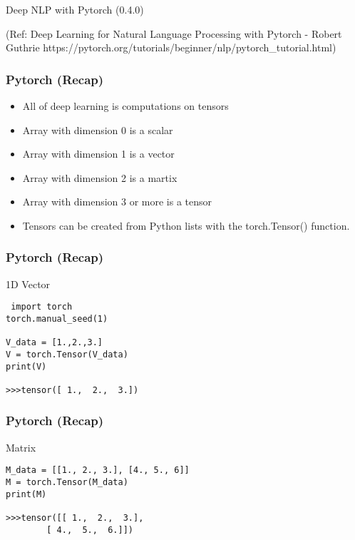 \begin{frame}[fragile]\frametitle{}

\begin{center}
{\Large Deep NLP with Pytorch (0.4.0)}

(Ref: Deep Learning for Natural Language Processing with Pytorch - Robert Guthrie  https://pytorch.org/tutorials/beginner/nlp/pytorch\_tutorial.html)
\end{center}
\end{frame}

\begin{frame}[fragile]
\frametitle{Pytorch (Recap)}
\begin{itemize}
\item All of deep learning is computations on tensors
\item Array with dimension 0 is a scalar
\item Array with dimension 1 is a vector
\item Array with dimension 2 is a martix
\item Array with dimension 3 or more is a tensor
\item Tensors can be created from Python lists with the torch.Tensor() function.
\end{itemize}
 \end{frame} 
 
\begin{frame}[fragile]
\frametitle{Pytorch (Recap)}
1D Vector
 \begin{lstlisting}
 import torch
torch.manual_seed(1)

V_data = [1.,2.,3.]
V = torch.Tensor(V_data)
print(V)

>>>tensor([ 1.,  2.,  3.])
 \end{lstlisting}

 \end{frame} 


 
\begin{frame}[fragile]
\frametitle{Pytorch (Recap)}
Matrix 
 \begin{lstlisting}
M_data = [[1., 2., 3.], [4., 5., 6]]
M = torch.Tensor(M_data)
print(M)

>>>tensor([[ 1.,  2.,  3.],
        [ 4.,  5.,  6.]])
 \end{lstlisting}

 \end{frame} 

